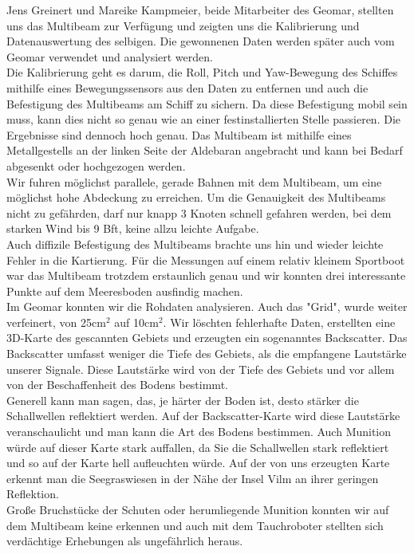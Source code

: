 Jens Greinert und Mareike Kampmeier, beide Mitarbeiter des Geomar, stellten uns das Multibeam zur Verfügung und zeigten uns die Kalibrierung und Datenauswertung des selbigen. Die gewonnenen Daten werden später auch vom Geomar verwendet und analysiert werden. \\

Die Kalibrierung geht es darum, die Roll, Pitch und Yaw-Bewegung des Schiffes mithilfe eines Bewegungssensors aus den Daten zu 
entfernen und auch die Befestigung des Multibeams am Schiff zu sichern. Da diese Befestigung mobil sein muss, kann
dies nicht so genau wie an einer festinstallierten Stelle passieren. Die Ergebnisse sind dennoch hoch genau. 
Das Multibeam ist mithilfe eines Metallgestells an der linken Seite der Aldebaran angebracht und kann bei Bedarf 
abgesenkt oder hochgezogen werden.\\

Wir fuhren möglichst parallele, gerade Bahnen mit dem Multibeam, um eine möglichst hohe Abdeckung zu erreichen. 
Um die Genauigkeit des Multibeams nicht zu gefährden, darf nur knapp 3 Knoten schnell gefahren werden, bei dem starken Wind bis 9 Bft, keine allzu leichte Aufgabe. \\

Auch diffizile Befestigung des Multibeams brachte uns hin und wieder leichte Fehler in die Kartierung. Für die Messungen auf einem relativ kleinem Sportboot war das Multibeam trotzdem erstaunlich genau und wir konnten drei interessante Punkte auf dem 
Meeresboden ausfindig machen. \\

Im Geomar konnten wir die Rohdaten analysieren. Auch das "Grid", wurde weiter verfeinert, von 25cm$^2$ auf 10cm$^2$. 
Wir löschten fehlerhafte Daten, erstellten eine 3D-Karte des gescannten Gebiets und erzeugten ein sogenanntes \glqq Backscatter\grqq . 
Das Backscatter umfasst weniger die Tiefe des Gebiets, als die empfangene Lautstärke unserer Signale. 
Diese Lautstärke wird von der Tiefe des Gebiets und vor allem von der Beschaffenheit des Bodens bestimmt. \\

Generell kann man sagen, das, je härter der Boden ist, desto stärker die Schallwellen reflektiert werden. 
Auf der Backscatter-Karte wird diese Lautstärke veranschaulicht und man kann die Art des Bodens bestimmen.
Auch Munition würde auf dieser Karte stark auffallen, da Sie die Schallwellen stark reflektiert und so 
auf der Karte hell aufleuchten würde. Auf der von uns erzeugten Karte erkennt man die Seegraswiesen in der Nähe der Insel Vilm an ihrer geringen Reflektion.\\

Große Bruchstücke der Schuten oder herumliegende Munition konnten wir auf dem Multibeam keine erkennen und 
auch mit dem Tauchroboter stellten sich verdächtige Erhebungen als ungefährlich heraus. \\
